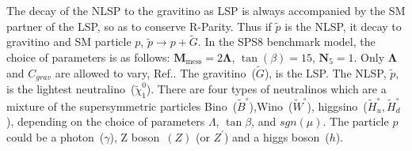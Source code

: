 {%
The decay of the NLSP to the gravitino as LSP is always accompanied by the SM partner of the LSP, so as to conserve R-Parity.
Thus if $\tilde{p}$ is the NLSP, it decay to gravitino and SM particle $p$, $ \tilde{p}\rightarrow p + \tilde{G}$.
In the SPS8 benchmark model, the choice of parameters is as follows: $\mathbf{M}_{\mbox{mess}} = 2\mathbf{\Lambda}$, $ \tan(\beta)=15$, $\mathbf{N}_{5}=1$. Only $\mathbf{\Lambda}$ and $C_{grav}$ are allowed to vary, Ref.\cite{SPS8}.
The gravitino~($\tilde{G}$), is the LSP. The NLSP, $\tilde{p}$, is the lightest neutralino~($\tilde{\chi}^{0}_{1}$). 
There are four types of neutralinos which are a mixture of the supersymmetric particles Bino~($\tilde{B}^{\circ}$),Wino~($\tilde{W}^{\circ}$), higgsino~($\tilde{H}^{\circ}_{u},\tilde{H}^{\circ}_{d}$), depending on the choice of parameters  $\Lambda$, $\tan\beta$, and $sgn(\mu)$.
The particle $p$ could be a photon~($\gamma$), Z boson~$(Z)$ (or $Z^{\prime}$) and a higgs boson~($h$).
}
